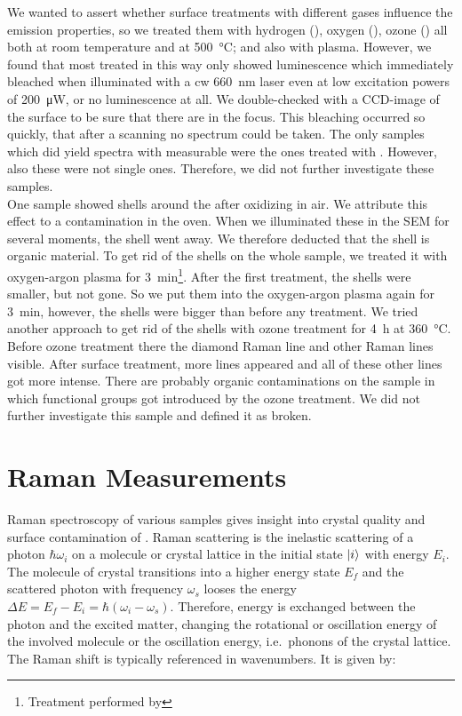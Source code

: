 				We wanted to assert whether surface treatments with different gases influence the emission properties, so we treated them with hydrogen (), oxygen (), ozone () all both at room temperature and at \SI{500}{\celsius}; and also with  plasma.
				However, we found that most \nds treated in this way only showed luminescence which immediately bleached when illuminated with a cw \SI{660}{nm} laser even at low excitation powers of \SI{200}{\micro\watt}, or no luminescence at all.
				We double-checked with a CCD-image of the surface to be sure that there are \nds in the focus.
				This bleaching occurred so quickly, that after a scanning no spectrum could be taken.
				The only samples which did yield spectra with measurable \ZPLs were the ones treated with .
				However, also these \sivs were not single ones.
				Therefore, we did not further investigate these samples.
				\\
				One sample showed shells around the \nd after oxidizing in air.
				We attribute this effect to a contamination in the oven.
				When we illuminated these \nds in the SEM for several moments, the shell went away.
				We therefore deducted that the shell is organic material.
				To get rid of the shells on the whole sample, we treated it with oxygen-argon plasma for \SI{3}{min}\footnote{Treatment performed by \schmauch}.
				After the first treatment, the shells were smaller, but not gone.
				So we put them into the oxygen-argon plasma again for \SI{3}{min}, however, the shells were bigger than before any treatment.
				We tried another approach to get rid of the shells with ozone treatment for \SI{4}{\hour} at \SI{360}{\celsius}.
				Before ozone treatment there the diamond Raman line and other Raman lines visible.
				After surface treatment, more lines appeared and all of these other lines got more intense.
				There are probably organic contaminations on the sample in which functional groups got introduced by the ozone treatment.
				We did not further investigate this sample and defined it as broken.

		\section{Raman Measurements}

			Raman spectroscopy of various samples gives insight into crystal quality and surface contamination of \nds.
			Raman scattering is the inelastic scattering of a photon $\hbar\omega_i$ on a molecule or crystal lattice in the initial state $\ket{i}$ with energy $E_i$.
			The molecule of crystal transitions into a higher energy state $E_f$ and the scattered photon with frequency $\omega_s$ looses the energy $\Delta E = E_f - E_i = \hbar(\omega_i-\omega_s)$.
			Therefore, energy is exchanged between the photon and the excited matter, changing the rotational or oscillation energy of the involved molecule or the oscillation energy, i.e.\ phonons of the crystal lattice.
			The Raman shift is typically referenced in wavenumbers.
			It is given by:

